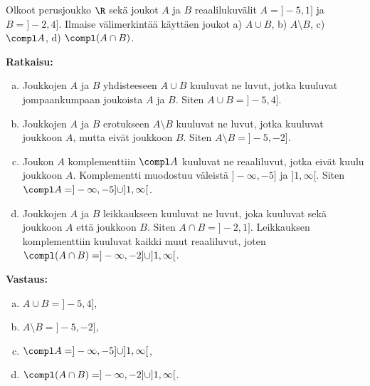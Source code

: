 \begin{esimerkki}
Olkoot perusjoukko $\R$ sekä joukot $A$ ja $B$ reaalilukuvälit $A = ]-5, 1]$ ja $B = ]-2, 4]$. Ilmaise välimerkintää käyttäen joukot a) $A\cup B$, b) $A \setminus B$, c) $\compl A$, d) $\compl( A \cap B)$. %

{\bf Ratkaisu:} 
\begin{enumerate}[a)]
\item Joukkojen $A$ ja $B$ yhdisteeseen $A \cup B$ kuuluvat ne luvut, jotka kuuluvat jompaankumpaan joukoista $A$ ja $B$. Siten $A\cup B = ]-5, 4]$.
\item Joukkojen $A$ ja $B$ erotukseen $A \setminus B$ kuuluvat ne luvut, jotka kuuluvat joukkoon $A$, mutta eivät joukkoon $B$. Siten $A \setminus B = ]-5, -2]$.
\item Joukon $A$ komplementtiin $\compl A$ kuuluvat ne reaaliluvut, jotka eivät kuulu joukkoon $A$. Komplementti muodostuu väleistä $]-\infty, -5]$ ja $]1, \infty [$. Siten $\compl A = ]-\infty, -5] \cup ]1, \infty [$.
\item Joukkojen $A$ ja $B$ leikkaukseen kuuluvat ne luvut, joka kuuluvat sekä joukkoon $A$ että joukkoon $B$. Siten $A\cap B = ]-2, 1]$. Leikkauksen komplementtiin kuuluvat kaikki muut reaaliluvut, joten $\compl( A \cap B) = ]-\infty, -2] \cup ]1,\infty [$.
\end{enumerate}

{\bf Vastaus:}
\begin{enumerate}[a)]
\item $A\cup B =]-5, 4]$,
\item $A \setminus B = ]-5, -2]$,
\item $\compl A = ]-\infty, -5] \cup ]1, \infty [$,
\item $\compl( A \cap B) = ]-\infty, -2] \cup ]1,\infty [$.
\end{enumerate}
\end{esimerkki}

